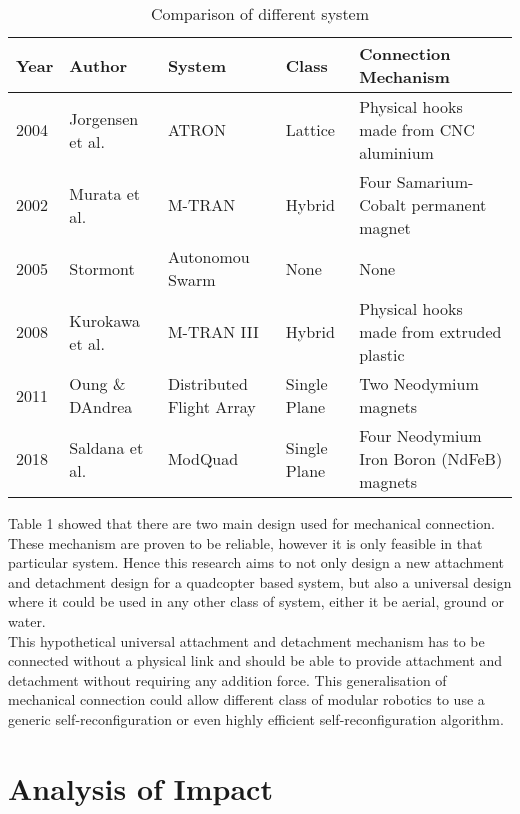 \documentclass[12pt,A4]{article}
\begin{document}
	\begin{table}[h]
		\centering
		\caption{Comparison of different system}
		\begin{tabular}{lp{2cm}p{2.3cm}lp{5cm}}
			\hline
			\hline
			Year & Author           & System                   & Class        & Connection Mechanism                      \\ \hline
			2004 & Jorgensen et al. & ATRON                    & Lattice      & Physical hooks made from CNC aluminium    \\
			2002 & Murata et al.    & M-TRAN                   & Hybrid       & Four Samarium-Cobalt permanent magnet     \\
			2005 & Stormont         & Autonomou Swarm          & None         & None                                      \\
			2008 & Kurokawa et al.  & M-TRAN III               & Hybrid       & Physical hooks made from extruded plastic  \\
			2011 & Oung \& DAndrea  & Distributed Flight Array & Single Plane & Two Neodymium magnets                     \\
			2018 & Saldana et al.   & ModQuad                  & Single Plane & Four Neodymium Iron Boron (NdFeB) magnets	\\ \hline
		\end{tabular}
	\end{table}
	
	Table 1 showed that there are two main design used for mechanical connection. These mechanism are proven to be reliable, however it is only feasible in that particular system. Hence this research aims to not only design a new attachment and detachment design for a quadcopter based system, but also a universal design where it could be used in any other class of system, either it be aerial, ground or water. \\
	
	This hypothetical universal attachment and detachment mechanism has to be connected without a physical link and should be able to provide attachment and detachment without requiring any addition force. This generalisation of mechanical connection could allow different class of modular robotics to use a generic self-reconfiguration or even highly efficient self-reconfiguration algorithm.

	\section{Analysis of Impact}
	
\end{document}

